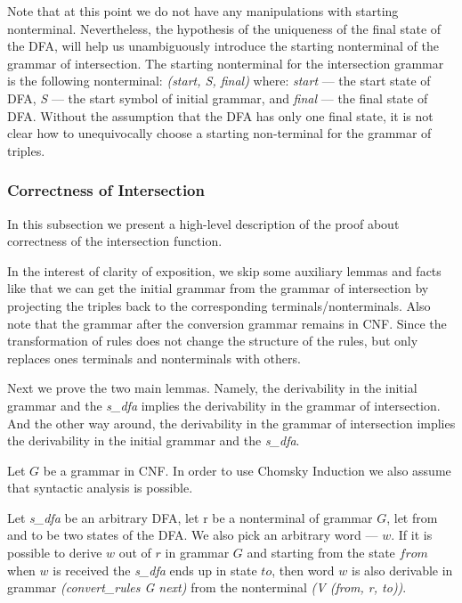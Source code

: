 Note that at this point we do not have any manipulations with starting nonterminal. Nevertheless, the hypothesis of the uniqueness of the final state of the DFA, will help us unambiguously introduce the starting nonterminal of the grammar of intersection. The starting nonterminal for the intersection grammar is the following nonterminal: \textit{(start, S, final)} where: \textit{start} --- the start state of DFA, \textit{S} --- the start symbol of initial grammar, and \textit{final} --- the final state of DFA. Without the assumption that the DFA has only one final state, it is not clear how to unequivocally choose a starting non-terminal for the grammar of triples.

\subsubsection{Correctness of Intersection}
\label{sec:correctintersection}

In this subsection we present a high-level description of the proof about correctness of the intersection function.

In the interest of clarity of exposition, we skip some auxiliary lemmas and facts like that we can get the initial grammar from the grammar of intersection by projecting the triples back to the corresponding terminals/nonterminals. Also note that the grammar after the conversion grammar remains in CNF. Since the transformation of rules does not change the structure of the rules, but only replaces ones terminals and nonterminals with others.

Next we prove the two main lemmas. Namely, the derivability in the initial grammar and the \textit{s\_dfa} implies the derivability in the grammar of intersection. And the other way around, the derivability in the grammar of intersection implies the derivability in the initial grammar and the \textit{s\_dfa}.

Let $G$ be a grammar in CNF. In order to use Chomsky Induction we also assume that syntactic analysis is possible. 


\begin{theorem}
    Let \textit{s\_dfa} be an arbitrary DFA, let r be a nonterminal of grammar $G$, let from and to be two states of the DFA. We also pick an arbitrary word --- $w$. If it is possible to derive $w$ out of $r$ in grammar $G$ and starting from the state $from$ when $w$ is received the \textit{s\_dfa} ends up in state $to$, then word $w$ is also derivable in grammar \textit{(convert\_rules G next)} from the nonterminal \textit{(V (from, r, to))}.
\end{theorem}


